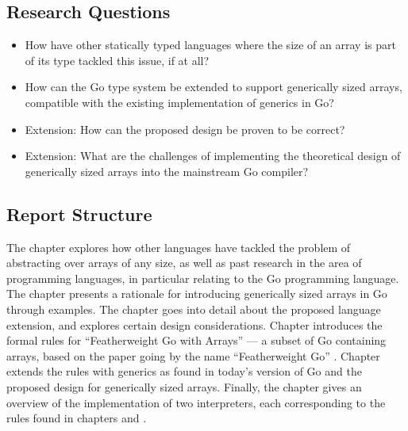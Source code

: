 \subsection{Research Questions}

\begin{itemize}
      \item How have other statically typed languages where the size of an array
            is part of its type tackled this issue, if at all?
      \item How can the Go type system be extended to support generically sized
            arrays, compatible with the existing implementation of generics in
            Go?
      \item Extension: How can the proposed design be proven to be correct?
      \item Extension: What are the challenges of implementing the theoretical
            design of generically sized arrays into the mainstream Go compiler?
\end{itemize}


\subsection{Report Structure}

The  chapter explores how
other languages have tackled the problem of abstracting over arrays of any size,
as well as past research in the area of programming languages, in particular
relating to the Go programming language. The
 chapter presents a rationale for
introducing generically sized arrays in Go through examples. The
 chapter goes into detail about the
proposed language extension, and explores certain design considerations. Chapter
 introduces the formal rules for ``Featherweight
Go with Arrays'' --- a subset of Go containing arrays, based on the paper going
by the name ``Featherweight Go'' \autocite{fg}. Chapter
 extends the rules with generics as found in
today's version of Go and the proposed design for generically sized arrays.
Finally, the  chapter gives an
overview of the implementation of two interpreters, each corresponding to the
rules found in chapters  and
.
